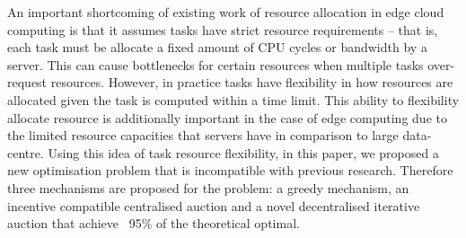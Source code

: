 An important shortcoming of existing work of resource allocation in edge cloud computing is that it assumes tasks have
strict resource requirements -- that is, each task must be allocate a fixed amount of CPU cycles or bandwidth by a
server. This can cause bottlenecks for certain resources when multiple tasks over-request resources. However, in
practice tasks have flexibility in how resources are allocated given the task is computed within a time limit. This
ability to flexibility allocate resource is additionally important in the case of edge computing due to the limited
resource capacities that servers have in comparison to large data-centre. Using this idea of task resource flexibility,
in this paper, we proposed a new optimisation problem that is incompatible with previous research. Therefore three
mechanisms are proposed for the problem: a greedy mechanism, an incentive compatible centralised auction and a novel
decentralised iterative auction that achieve ~95\% of the theoretical optimal.

